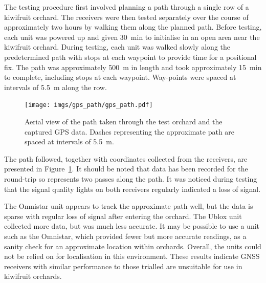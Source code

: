 \documentclass[preprint,authoryear,12pt]{elsarticle}
\begin{document}
        The testing procedure first involved planning a path through a single row of a kiwifruit orchard.
        The receivers were then tested separately over the course of approximately two hours by walking them along the planned path.
        Before testing, each unit was powered up and given \SI{30}{\minute} to initialise in an open area near the kiwifruit orchard.
        During testing, each unit was walked slowly along the predetermined path with stops at each waypoint to provide time for a positional fix.
        The path was approximately \SI{500}{\meter} in length and took approximately \SI{15}{\minute} to complete, including stops at each waypoint.
        Way-points were spaced at intervals of \SI{5.5}{\meter} along the row.

        \begin{figure}[htb]
            \centering
            \texttt{[image: imgs/gps\_path/gps\_path.pdf]}
            \caption{
                Aerial view of the path taken through the test orchard and the captured GPS data.
                Dashes representing the approximate path are spaced at intervals of \SI{5.5}{\meter}.
            }
            \label{fig:gpsResults}
        \end{figure}

        The path followed, together with coordinates collected from the receivers, are presented in Figure~\ref{fig:gpsResults}.
        It should be noted that data has been recorded for the round-trip so represents two passes along the path.
        It was noticed during testing that the signal quality lights on both receivers regularly indicated a loss of signal.

        The Omnistar unit appears to track the approximate path well, but the data is sparse with regular loss of signal after entering the orchard.
        The Ublox unit collected more data, but was much less accurate.
        It may be possible to use a unit such as the Omnistar, which provided fewer but more accurate readings, as a sanity check for an approximate location within orchards.
        Overall, the units could not be relied on for localisation in this environment.
        These results indicate GNSS receivers with similar performance to those trialled are unsuitable for use in kiwifruit orchards.
\end{document}
